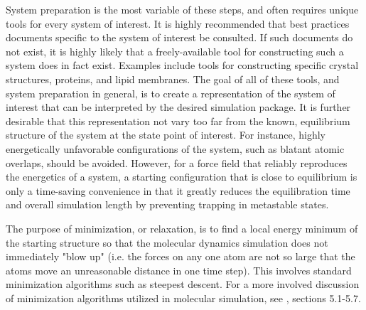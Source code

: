 \documentclass[9pt,bestpractices]{livecoms}
\begin{document}
System preparation is the most variable of these steps, and often requires unique tools for every system of interest. 
It is highly recommended that best practices documents specific to the system of interest be consulted. 
If such documents do not exist, it is highly likely that a freely-available tool for constructing such a system does in fact exist. 
Examples include tools for constructing specific crystal structures, proteins, and lipid membranes. %
The goal of all of these tools, and system preparation in general, is to create a representation of the system of interest that can be interpreted by the desired simulation package. 
It is further desirable that this representation not vary too far from the known, equilibrium structure of the system at the state point of interest. 
For instance, highly energetically unfavorable configurations of the system, such as blatant atomic overlaps, should be avoided. 
However, for a force field that reliably reproduces the energetics of a system, a starting configuration that is close to equilibrium is only a time-saving convenience in that it greatly reduces the equilibration time and overall simulation length by preventing trapping in metastable states.

The purpose of minimization, or relaxation, is to find a local energy minimum of the starting structure so that the molecular dynamics simulation does not immediately "blow up" (i.e. the forces on any one atom are not so large that the atoms move an unreasonable distance in one time step). 
This involves standard minimization algorithms such as steepest descent. 
For a more involved discussion of minimization algorithms utilized in molecular simulation, see \citet{LeachBook}, sections 5.1-5.7.
\end{document}
